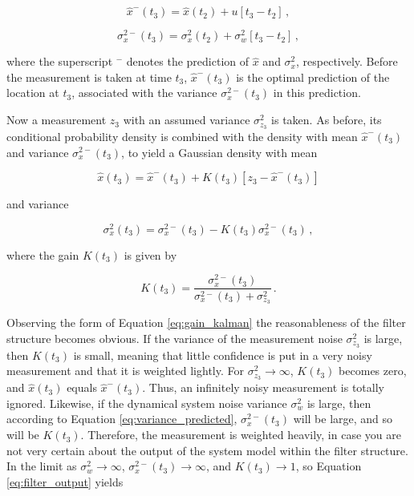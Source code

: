 \begin{equation}\label{eq:system_model}
  \hat{x}^-(t_3)=\hat{x}(t_2)+u[t_3-t_2]\,,
\end{equation}

\begin{equation}\label{eq:variance_predicted}
  \sigma^{2-}_x(t_3)=\sigma^2_x(t_2)+\sigma^2_w[t_3-t_2]\,,
\end{equation}

\noindent
where the superscript $^-$ denotes the prediction of $\hat{x}$ and $\sigma^{2}_x$, respectively. Before the measurement is taken at time $t_3$, $\hat{x}^-(t_3)$ is the optimal prediction of the location at $t_3$, associated with the variance $\sigma^{2-}_x(t_3)$ in this prediction.

Now a measurement $z_3$ with an assumed variance $\sigma^2_{z_3}$ is taken. As before, its conditional probability density is combined with the density with mean $\hat{x}^-(t_3)$ and variance $\sigma^{2-}_x(t_3)$, to yield a Gaussian density with mean

\begin{equation}\label{eq:estimation_kalman}
  \hat{x}(t_3) = \hat{x}^-(t_3) + K(t_3)[z_3-\hat{x}^-(t_3)]
\end{equation}

\noindent
and variance

\begin{equation}\label{eq:variance_kalman}
  \sigma^2_x(t_3) = \sigma^{2-}_x(t_3)-K(t_3)\sigma^{2-}_x(t_3)\,,
\end{equation}

\noindent
where the gain $K(t_3)$ is given by

\begin{equation}\label{eq:gain_kalman}
  K(t_3) = \frac{\sigma^{2-}_x(t_3)}{\sigma^{2-}_x(t_3)+\sigma^2_{z_3}}\,.
\end{equation}

Observing the form of Equation \ref{eq:gain_kalman} the reasonableness of the filter structure becomes obvious. If the variance of the measurement noise $\sigma^2_{z_3}$ is large, then $K(t_3)$ is small, meaning that little confidence is put in a very noisy measurement and that it is weighted lightly. For $\sigma^2_{z_3}\rightarrow\infty$, $K(t_3)$ becomes zero, and $\hat{x}(t_3)$ equals $\hat{x}^-(t_3)$. Thus, an infinitely noisy measurement is totally ignored. Likewise, if the dynamical system noise variance $\sigma^2_w$ is large, then according to Equation \ref{eq:variance_predicted}, $\sigma^{2-}_x(t_3)$ will be large, and so will be $K(t_3)$. Therefore, the measurement is weighted heavily, in case you are not very certain about the output of the system model within the filter structure. In the limit as $\sigma^2_w \rightarrow\infty$, $\sigma^{2-}_x(t_3) \rightarrow\infty$, and $K(t_3) \rightarrow1$, so Equation \ref{eq:filter_output} yields

